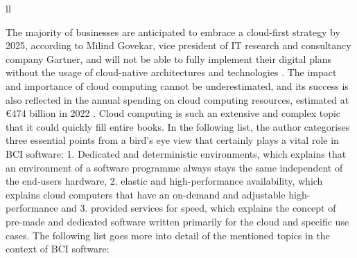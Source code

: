 \begin{table}[!ht]
{\begin{tabular}{ll}
       \\ \hline
    \end{tabular}%
  }
  \vspace{10pt}
  \caption{The three abstraction levels and types of cloud computing \citep{amazon_web_services_inc_what_nodate}.}
  \vspace{-5pt}
  \label{tab:cloud-computing-types}
\end{table}

The majority of businesses are anticipated to embrace a cloud-first strategy by 2025, according to Milind Govekar, vice president of IT research and consultancy company Gartner, and will not be able to fully implement their digital plans without the usage of cloud-native architectures and technologies \citep{gartner_gartner_nodate}. The impact and importance of cloud computing cannot be underestimated, and its success is also reflected in the annual spending on cloud computing resources, estimated at €474 billion in 2022 \citep{gartner_gartner_nodate}. Cloud computing is such an extensive and complex topic that it could quickly fill entire books. In the following list, the author categorises three essential points from a bird's eye view that certainly plays a vital role in BCI software: 1. Dedicated and deterministic environments, which explains that an environment of a software programme always stays the same independent of the end-users hardware, 2. elastic and high-performance availability, which explains cloud computers that have an on-demand and adjustable high-performance and 3. provided services for speed, which explains the concept of pre-made and dedicated software written primarily for the cloud and specific use cases. The following list goes more into detail of the mentioned topics in the context of BCI software:

